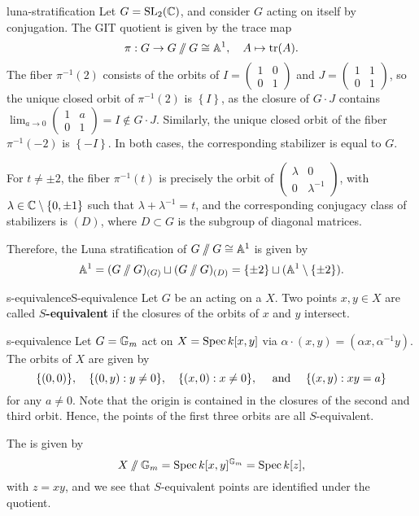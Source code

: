 \begin{example}{luna-stratification}
    Let $G = \textup{SL}_2(\CC)$, and consider $G$ acting on itself by conjugation. The GIT quotient is given by the trace map
    \[ \pi : G \to G \sslash G \isom \AA^1, \quad A \mapsto \tr(A) . \]
    The fiber $\pi^{-1}(2)$ consists of the orbits of $I = \left(\begin{smallmatrix} 1 & 0 \\ 0 & 1 \end{smallmatrix}\right)$ and $J = \left(\begin{smallmatrix} 1 & 1 \\ 0 & 1 \end{smallmatrix} \right)$, so the unique closed orbit of $\pi^{-1}(2)$ is $\left\{ I \right\}$, as the closure of $G \cdot J$ contains $\lim_{a \to 0} \left(\begin{smallmatrix} 1 & a \\ 0 & 1 \end{smallmatrix}\right) = I \not\in G \cdot J$. Similarly, the unique closed orbit of the fiber $\pi^{-1}(-2)$ is $\left\{ -I \right\}$. In both cases, the corresponding stabilizer is equal to $G$.
    
    For $t \ne \pm 2$, the fiber $\pi^{-1}(t)$ is precisely the orbit of $\left(\begin{smallmatrix} \lambda & 0 \\ 0 & \lambda^{-1} \end{smallmatrix}\right)$, with $\lambda \in \CC \setminus \{ 0, \pm 1 \}$ such that $\lambda + \lambda^{-1} = t$, and the corresponding conjugacy class of stabilizers is $(D)$, where $D \subset G$ is the subgroup of diagonal matrices.
    
    Therefore, the Luna stratification of $G \sslash G \isom \AA^1$ is given by
    \[ \AA^1 = (G \sslash G)_{(G)} \sqcup (G \sslash G)_{(D)}  = \{ \pm 2 \} \sqcup (\AA^1 \setminus \{ \pm 2 \}) . \]
\end{example}

\begin{topic}{s-equivalence}{S-equivalence}
    Let $G$ be an  acting on a  $X$. Two points $x, y \in X$ are called \textbf{$S$-equivalent} if the closures of the orbits of $x$ and $y$ intersect.
\end{topic}

\begin{example}{s-equivalence}
    Let $G = \GG_m$ act on $X = \Spec k[x, y]$ via $\alpha \cdot (x, y) = (\alpha x, \alpha^{-1} y)$. The orbits of $X$ are given by
    \[ \{ (0, 0) \}, \quad \{ (0, y) : y \ne 0  \}, \quad \{ (x, 0) : x \ne 0  \}, \quad \textup{ and } \quad \{ (x, y) : xy = a \}  \]
    for any $a \ne 0$. Note that the origin is contained in the closures of the second and third orbit. Hence, the points of the first three orbits are all $S$-equivalent.
    
    The  is given by
    \[ X \sslash \GG_m = \Spec k[x, y]^{\GG_m} = \Spec k[z] , \]
    with $z = xy$, and we see that $S$-equivalent points are identified under the quotient.
\end{example}

